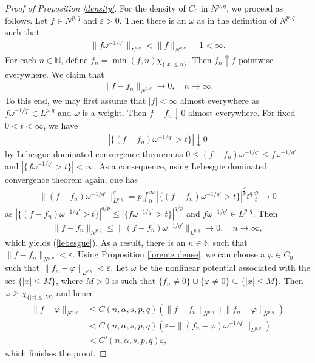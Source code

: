\documentclass[10pt,reqno]{amsart}
\numberwithin{equation}{section}
\begin{document}
\begin{proof}[Proof of Proposition \ref{density}]
For the density of $C_{0}$ in $N^{p,q}$, we proceed as follows. Let $f\in N^{p,q}$ and $\varepsilon>0$. Then there is an $\omega$ as in the definition of $N^{p,q}$ such that 
\begin{align*}
\|f\omega^{-1/q'}\|_{L^{p,q}}<\|f\|_{N^{p,q}}+1<\infty.
\end{align*}
For each $n\in\mathbb{N}$, define $f_{n}=\min(f,n)\chi_{\{|x|\leq n\}}$. Then $f_{n}\uparrow f$ pointwise everywhere. We claim that 
\begin{align}\label{lebesgue}
\|f-f_{n}\|_{N^{p,q}}\rightarrow 0,\quad n\rightarrow\infty.
\end{align}
To this end, we may first assume that $|f|<\infty$ almost everywhere as $f\omega^{-1/q'}\in L^{p,q}$ and $\omega$ is a weight. Then $f-f_{n}\downarrow 0$ almost everywhere. For fixed $0<t<\infty$, we have 
\begin{align*}
|\{(f-f_{n})\omega^{-1/q'}>t\}|\downarrow 0
\end{align*}
by Lebesgue dominated convergence theorem as $0\leq(f-f_{n})\omega^{-1/q'}\leq f\omega^{-1/q'}$ and $|\{f\omega^{-1/q'}>t\}|<\infty$. As a consequence, using Lebesgue dominated convergence theorem again, one has 
\begin{align*}
\|(f-f_{n})\omega^{-1/q'}\|_{L^{p,q}}^{q}=p\int_{0}^{\infty}|\{(f-f_{n})\omega^{-1/q'}>t\}|^{\frac{q}{p}}t^{q}\frac{dt}{t}\rightarrow 0
\end{align*}
as $|\{(f-f_{n})\omega^{-1/q'}>t\}|^{q/p}\leq|\{f\omega^{-1/q'}>t\}|^{q/p}$ and $f\omega^{-1/q'}\in L^{p,q}$. Then 
\begin{align*}
\|f-f_{n}\|_{N^{p,q}}\leq\|(f-f_{n})\omega^{-1/q'}\|_{L^{p,q}}\rightarrow 0,\quad n\rightarrow\infty,
\end{align*}
which yields (\ref{lebesgue}). As a result, there is an $n\in\mathbb{N}$ such that $\|f-f_{n}\|_{N^{p,q}}<\varepsilon$. Using Proposition \ref{lorentz dense}, we can choose a $\varphi\in C_{0}$ such that $\|f_{n}-\varphi\|_{L^{p,q}}<\varepsilon$. Let $\omega$ be the nonlinear potential associated with the set $\{|x|\leq M\}$, where $M>0$ is such that $\{f_{n}\ne 0\}\cup\{\varphi\ne 0\}\subseteq\{|x|\leq M\}$. Then $\omega\geq\chi_{\{|x|\leq M\}}$ and hence 
\begin{align*}
\|f-\varphi\|_{N^{p,q}}&\leq C(n,\alpha,s,p,q)(\|f-f_{n}\|_{N^{p,q}}+\|f_{n}-\varphi\|_{N^{p,q}})\\
&<C(n,\alpha,s,p,q)(\varepsilon+\|(f_{n}-\varphi)\omega^{-1/q'}\|_{L^{p,q}})\\
&<C'(n,\alpha,s,p,q)\varepsilon,
\end{align*}
which finishes the proof.
\end{proof}
\end{document}
